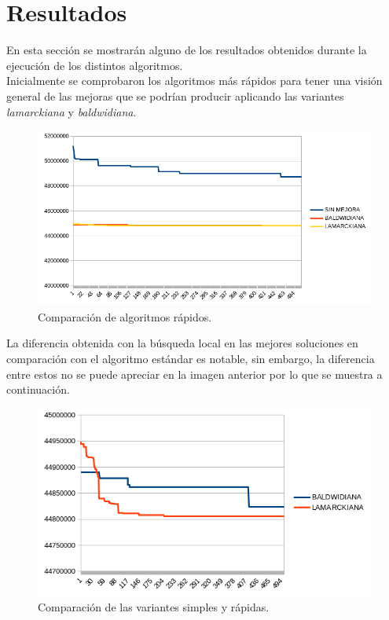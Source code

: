 \section{Resultados}

En esta sección se mostrarán alguno de los resultados obtenidos durante la ejecución de los distintos algoritmos.\\

Inicialmente se comprobaron los algoritmos más rápidos para tener una visión general de las mejoras que se podrían producir aplicando las variantes \textit{lamarckiana} y \textit{baldwidiana}.

	\begin{figure}[H]
	\centering
	\includegraphics[scale=0.8]{images/AGEcomp.png} 
	\caption{Comparación de algoritmos rápidos.}
	\label{perc}
	\end{figure}
	
La diferencia obtenida con la búsqueda local en las mejores soluciones en comparación con el algoritmo estándar es notable, sin embargo, la diferencia entre estos no se puede apreciar en la imagen anterior por lo que se muestra a continuación.

	\begin{figure}[H]
	\centering
	\includegraphics[scale=0.9]{images/AGEcompBL.png} 
	\caption{Comparación de las variantes simples y rápidas.}
	\label{perc}
	\end{figure}

